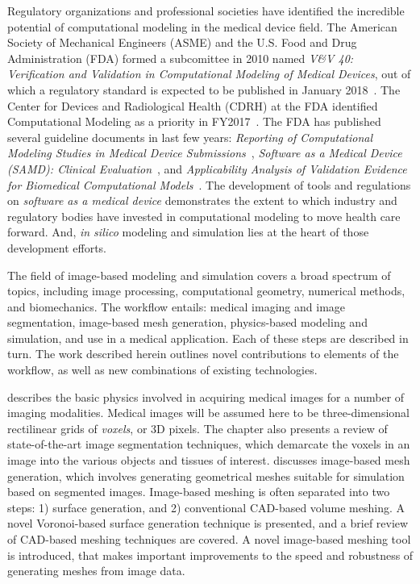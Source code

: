Regulatory organizations and professional societies have identified the incredible potential of computational modeling in the medical device field. The American Society of Mechanical Engineers (ASME) and the U.S. Food and Drug Administration (FDA) formed a subcomittee in 2010 named \textit{V\&V 40: Verification and Validation in Computational Modeling of Medical Devices}, out of which a regulatory standard is expected to be published in January 2018~\cite{committee}. The Center for Devices and Radiological Health (CDRH) at the FDA identified Computational Modeling as a priority in FY2017~\cite{Morrison2017}. The FDA has published several guideline documents in last few years: \textit{Reporting of Computational Modeling Studies in Medical Device Submissions}~\cite{fda1_2016}, \textit{Software as a Medical Device (SAMD): Clinical Evaluation}~\cite{fda1_2016}, and \textit{Applicability Analysis of Validation Evidence for Biomedical Computational Models}~\cite{pathmanathan_2017}. The development of tools and regulations on \textit{software as a medical device} demonstrates the extent to which industry and regulatory bodies have invested in computational modeling to move health care forward. And, \textit{in silico} modeling and simulation lies at the heart of those development efforts.


The field of image-based modeling and simulation covers a broad spectrum of topics, including image processing, computational geometry, numerical methods, and biomechanics. The workflow entails: medical imaging and image segmentation, image-based mesh generation, physics-based modeling and simulation, and use in a medical application. Each of these steps are described in turn. The work described herein outlines novel contributions to elements of the workflow, as well as new combinations of existing technologies.

 describes the basic physics involved in acquiring medical images for a number of imaging modalities. Medical images will be assumed here to be three-dimensional rectilinear grids of \textit{voxels}, or 3D pixels. The chapter also presents a review of state-of-the-art image segmentation techniques, which demarcate the voxels in an image into the various objects and tissues of interest.  discusses image-based mesh generation, which involves generating geometrical meshes suitable for simulation based on segmented images. Image-based meshing is often separated into two steps: 1) surface generation,  and 2) conventional CAD-based volume meshing. A novel Voronoi-based surface generation technique is presented, and a brief review of CAD-based meshing techniques are covered. A novel image-based meshing tool is introduced, that makes important improvements to the speed and robustness of generating meshes from image data.


